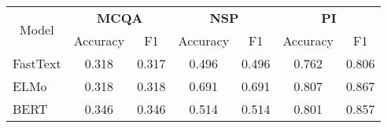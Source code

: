 \documentclass{article}
\begin{document}
\begin{CJK}{UTF8}{gbsn}


\begin{tabular}{l@{\hskip 0.4in}ccc@{\hskip 0.3in}ccc}\hline \multicolumn{1}{c}{\multirow{2}{*}{Model}} & \multicolumn{2}{c}{\bf MCQA} & \multicolumn{2}{c}{\bf NSP} & \multicolumn{2}{c}{\bf PI} \\\multicolumn{1}{c}{} & Accuracy & F1 & Accuracy & F1 & Accuracy & F1 \\ \hline FastText & 0.318 & 0.317 & 0.496 & 0.496 & 0.762 & 0.806 \\ELMo & 0.318 & 0.318 & 0.691 & 0.691 & 0.807 & 0.867 \\BERT & 0.346 & 0.346 & 0.514 & 0.514 & 0.801 & 0.857 \\ \hline \end{tabular}

\end{CJK}
\end{document}
